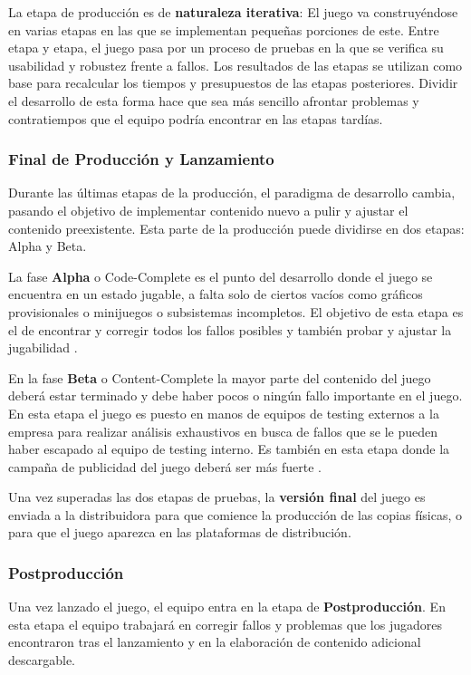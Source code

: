 La etapa de producción es de \textbf{naturaleza iterativa}: El juego va construyéndose en varias etapas en las que se implementan pequeñas porciones de este. Entre etapa y etapa, el juego pasa por un proceso de pruebas en la que se verifica su usabilidad y robustez frente a fallos. Los resultados de las etapas se utilizan como base para recalcular los tiempos y presupuestos de las etapas posteriores. Dividir el desarrollo de esta forma hace que sea más sencillo afrontar problemas y contratiempos que el equipo podría encontrar en las etapas tardías.

\subsubsection{Final de Producción y Lanzamiento}
Durante las últimas etapas de la producción, el paradigma de desarrollo cambia, pasando el objetivo de implementar contenido nuevo a pulir y ajustar el contenido preexistente. Esta parte de la producción puede dividirse en dos etapas: Alpha y Beta.

La fase \textbf{Alpha} o Code-Complete es el punto del desarrollo donde el juego se encuentra en un estado jugable, a falta solo de ciertos vacíos como gráficos provisionales o minijuegos o subsistemas incompletos. El objetivo de esta etapa es el de encontrar y corregir todos los fallos posibles y también probar y ajustar la jugabilidad \cite{development_and_production}.

En la fase \textbf{Beta} o Content-Complete la mayor parte del contenido del juego deberá estar terminado y debe haber pocos o ningún fallo importante en el juego. En esta etapa el juego es puesto en manos de equipos de testing externos a la empresa para realizar análisis exhaustivos en busca de fallos que se le pueden haber escapado al equipo de testing interno. Es también en esta etapa donde la campaña de publicidad del juego deberá ser más fuerte \cite{development_and_production}.

Una vez superadas las dos etapas de pruebas, la \textbf{versión final} del juego es enviada a la distribuidora para que comience la producción de las copias físicas, o para que el juego aparezca en las plataformas de distribución.

\subsubsection{Postproducción}
Una vez lanzado el juego, el equipo entra en la etapa de \textbf{Postproducción}. En esta etapa el equipo trabajará en corregir fallos y problemas que los jugadores encontraron tras el lanzamiento y en la elaboración de contenido adicional descargable.

